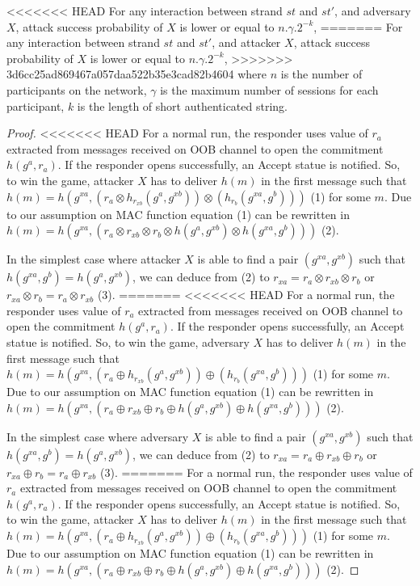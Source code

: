 \begin{enumerate}
\begin{enumerate}
\begin{Lemma}\label{lemme5.1}

<<<<<<< HEAD
For any interaction between strand $st$ and $st'$, and adversary $X$, attack success probability of $X$ is lower or equal to $n.\gamma.2^{-k}$, 
=======
For any interaction between strand $st$ and $st'$, and attacker $X$, attack success probability of $X$ is lower or equal to $n.\gamma.2^{-k}$, 
>>>>>>> 3d6cc25ad869467a057daa522b35e3cad82b4604
where $n$ is the number of participants on the network, $\gamma$ is the maximum number of sessions for each participant, $k$ is the length of short authenticated string. 
\end{Lemma}

\begin{proof}
<<<<<<< HEAD
For a normal run, the responder uses value of $r_a$ extracted from messages received on OOB channel to open the commitment $h(g^a, r_a)$. If the responder opens successfully, an Accept statue is notified. So, to win the game, attacker $X$ has to deliver $h(m)$ in the first message such that $h(m) = h(g^{xa}, (r_a \otimes h_{r_{xb}}(g^a,g^{xb})) \otimes (h_{r_b}(g^{xa},g^b)))$ (1) for some $m$. Due to our assumption on MAC function equation (1) can be rewritten in $h(m) = h(g^{xa}, (r_a \otimes r_{xb} \otimes r_b \otimes h(g^a,g^{xb}) \otimes h(g^{xa},g^b)))$ (2). 

In the simplest case where attacker $X$ is able to find a pair $(g^{xa},g^{xb})$ such that $h(g^{xa},g^b) = h(g^a,g^{xb})$, we can deduce from (2) to $r_{xa} = r_a \otimes r_{xb} \otimes r_b$ or $r_{xa} \otimes r_b = r_a \otimes r_{xb}$ (3).
=======
<<<<<<< HEAD
For a normal run, the responder uses value of $r_a$ extracted from messages received on OOB channel to open the commitment $h(g^a, r_a)$. If the responder opens successfully, an Accept statue is notified. So, to win the game, adversary $X$ has to deliver $h(m)$ in the first message such that $h(m) = h(g^{xa}, (r_a \oplus h_{r_{xb}}(g^a,g^{xb})) \oplus (h_{r_b}(g^{xa},g^b)))$ (1) for some $m$. Due to our assumption on MAC function equation (1) can be rewritten in $h(m) = h(g^{xa}, (r_a \oplus r_{xb} \oplus r_b \oplus h(g^a,g^{xb}) \oplus h(g^{xa},g^b)))$ (2). 

In the simplest case where adversary $X$ is able to find a pair $(g^{xa},g^{xb})$ such that $h(g^{xa},g^b) = h(g^a,g^{xb})$, we can deduce from (2) to $r_{xa} = r_a \oplus r_{xb} \oplus r_b$ or $r_{xa} \oplus r_b = r_a \oplus r_{xb}$ (3).
=======
For a normal run, the responder uses value of $r_a$ extracted from messages received on OOB channel to open the commitment $h(g^a, r_a)$. If the responder opens successfully, an Accept statue is notified. So, to win the game, attacker $X$ has to deliver $h(m)$ in the first message such that $h(m) = h(g^{xa}, (r_a \oplus h_{r_{xb}}(g^a,g^{xb})) \oplus (h_{r_b}(g^{xa},g^b)))$ (1) for some $m$. Due to our assumption on MAC function equation (1) can be rewritten in $h(m) = h(g^{xa}, (r_a \oplus r_{xb} \oplus r_b \oplus h(g^a,g^{xb}) \oplus h(g^{xa},g^b)))$ (2). 


\end{proof}
\end{enumerate}
\end{enumerate}
